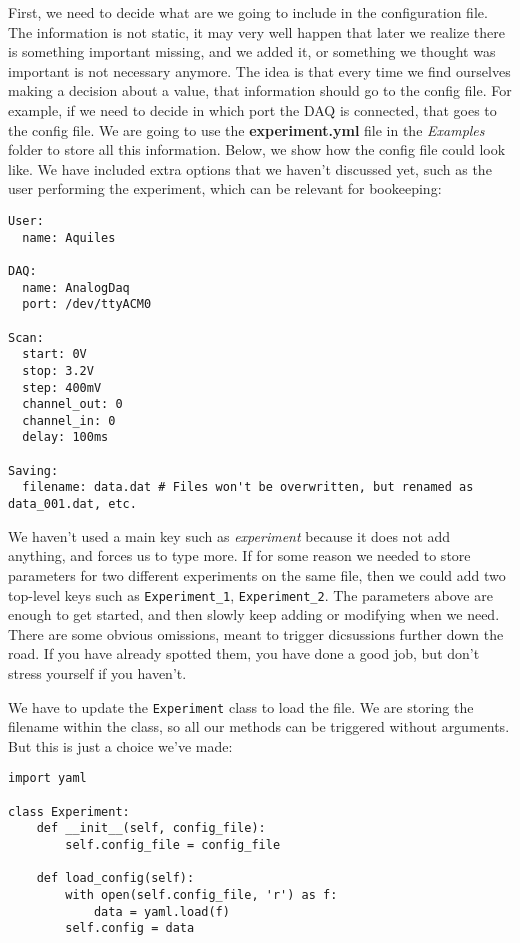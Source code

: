 First, we need to decide what are we going to include in the configuration file. The information is not static, it may very well happen that later we realize there is something important missing, and we added it, or something we thought was important is not necessary anymore. The idea is that every time we find ourselves making a decision about a value, that information should go to the config file. For example, if we need to decide in which port the DAQ is connected, that goes to the config file. We are going to use the \textbf{experiment.yml} file in the \emph{Examples} folder to store all this information. Below, we show how the config file could look like. We have included extra options that we haven't discussed yet, such as the user performing the experiment, which can be relevant for bookeeping:

\begin{verbatim}
User:
  name: Aquiles

DAQ:
  name: AnalogDaq
  port: /dev/ttyACM0

Scan:
  start: 0V
  stop: 3.2V
  step: 400mV
  channel_out: 0
  channel_in: 0
  delay: 100ms

Saving:
  filename: data.dat # Files won't be overwritten, but renamed as data_001.dat, etc.
\end{verbatim}

We haven't used a main key such as \emph{experiment} because it does not add anything, and forces us to type more. If for some reason we needed to store parameters for two different experiments on the same file, then we could add two top-level keys such as \texttt{Experiment\_1}, \texttt{Experiment\_2}. The parameters above are enough to get started, and then slowly keep adding or modifying when we need. There are some obvious omissions, meant to trigger dicsussions further down the road. If you have already spotted them, you have done a good job, but don't stress yourself if you haven't.

We have to update the \texttt{Experiment} class to load the file. We are storing the filename within the class, so all our methods can be triggered without arguments. But this is just a choice we've made:

\begin{verbatim}
import yaml

class Experiment:
    def __init__(self, config_file):
        self.config_file = config_file

    def load_config(self):
        with open(self.config_file, 'r') as f:
            data = yaml.load(f)
        self.config = data
\end{verbatim}

